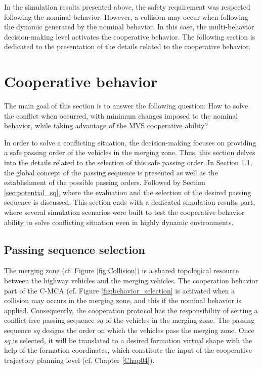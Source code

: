 In the simulation results presented above, the safety requirement was respected following the nominal behavior. However, a collision may occur when following the dynamic generated by the nominal behavior. In this case, the multi-behavior decision-making level activates the cooperative behavior. The following section is dedicated to the presentation of the details related to the cooperative behavior. 

\section{Cooperative behavior}\label{sec:Cooperative_mode}
The main goal of this section is to answer the following question: How to solve the conflict when occurred, with minimum changes imposed to the nominal behavior, while taking advantage of the MVS cooperative ability?

In order to solve a conflicting situation, the decision-making focuses on providing a safe passing order of the vehicles in the merging zone. Thus, this section delves into the details related to the selection of this safe passing order. In Section \ref{sec:passing_sequence_selection}, the global concept of the passing sequence is presented as well as the establishment of the possible passing orders. Followed by Section \ref{sec:potential_sq}, where the evaluation and the selection of the desired passing sequence is discussed. This section ends with a dedicated simulation results part, where several simulation scenarios were built to test the cooperative behavior ability to solve conflicting situation even in highly dynamic environments. 

\subsection{Passing sequence selection}\label{sec:passing_sequence_selection}



The merging zone (cf. Figure \ref{fig:Collision}) is a shared topological resource between the highway vehicles and the merging vehicles. The cooperation behavior part of the C-MCA (cf. Figure \ref{fig:behavior_selection} is activated when a collision may occurs in the merging zone, and this if the nominal behavior is applied. Consequently, the cooperation protocol has the responsibility of setting a conflict-free passing sequence $sq$ of the vehicles in the merging zone. The passing sequence $sq$ designs the order on which the vehicles pass the merging zone. Once $sq$ is selected, it will be translated to a desired formation virtual shape with the help of the formation coordinates, which constitute the input of the cooperative trajectory planning level (cf. Chapter \ref{Chap04}). 

